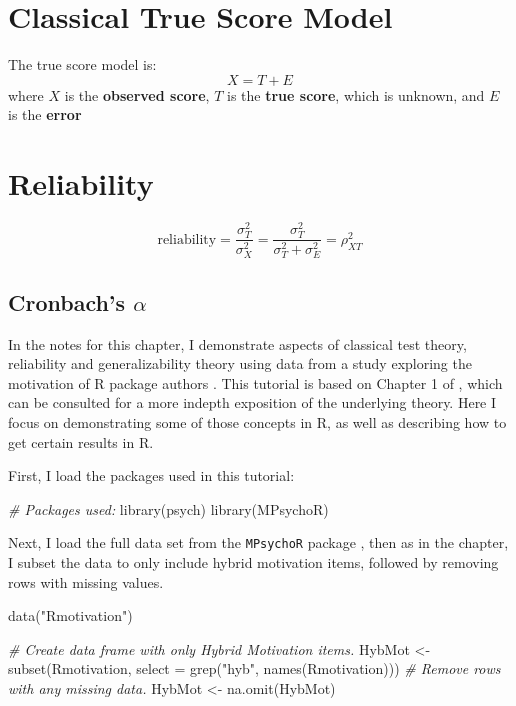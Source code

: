 \documentclass[
]{book}
\newenvironment{Shaded}{\begin{snugshade}}{\end{snugshade}}
\newcommand{\AttributeTok}[1]{\textcolor[rgb]{0.77,0.63,0.00}{#1}}
\newcommand{\CommentTok}[1]{\textcolor[rgb]{0.56,0.35,0.01}{\textit{#1}}}
\newcommand{\FunctionTok}[1]{\textcolor[rgb]{0.00,0.00,0.00}{#1}}
\newcommand{\NormalTok}[1]{#1}
\newcommand{\OtherTok}[1]{\textcolor[rgb]{0.56,0.35,0.01}{#1}}
\newcommand{\StringTok}[1]{\textcolor[rgb]{0.31,0.60,0.02}{#1}}
\begin{document}
\hypertarget{classical-true-score-model}{%
\section{Classical True Score Model}\label{classical-true-score-model}}

The true score model is:
\[
X = T + E
\]
where \(X\) is the \textbf{observed score}, \(T\) is the \textbf{true score}, which is unknown, and \(E\) is the \textbf{error}

\hypertarget{reliability}{%
\section{Reliability}\label{reliability}}

\[
\text{reliability} = \frac{\sigma^2_T}{\sigma^2_X} = \frac{\sigma^2_T}{\sigma^2_T + \sigma^2_E} = \rho^2_{XT}
\]

\hypertarget{cronbachs-alpha}{%
\subsection{\texorpdfstring{Cronbach's \(\alpha\)}{Cronbach's \textbackslash alpha}}\label{cronbachs-alpha}}

In the notes for this chapter, I demonstrate aspects of classical test theory, reliability and generalizability theory using data from a study exploring the motivation of R package authors \citep{mair2015motivation}.
This tutorial is based on Chapter 1 of \citet{mair2018modern}, which can be consulted for a more indepth exposition of the underlying theory.
Here I focus on demonstrating some of those concepts in R, as well as describing how to get certain results in R.

First, I load the packages used in this tutorial:

\begin{Shaded}
\begin{Highlighting}[]
\CommentTok{\# Packages used:}
\FunctionTok{library}\NormalTok{(psych)}
\FunctionTok{library}\NormalTok{(MPsychoR)}
\end{Highlighting}
\end{Shaded}

Next, I load the full data set from the \texttt{MPsychoR} package \citep{Mair2020mpsychor}, then as in the chapter, I subset the data to only include hybrid motivation items, followed by removing rows with missing values.

\begin{Shaded}
\begin{Highlighting}[]
\FunctionTok{data}\NormalTok{(}\StringTok{"Rmotivation"}\NormalTok{)}

\CommentTok{\# Create data frame with only Hybrid Motivation items.}
\NormalTok{HybMot }\OtherTok{\textless{}{-}} \FunctionTok{subset}\NormalTok{(Rmotivation, }
                        \AttributeTok{select =} \FunctionTok{grep}\NormalTok{(}\StringTok{"hyb"}\NormalTok{, }\FunctionTok{names}\NormalTok{(Rmotivation)))}
\CommentTok{\# Remove rows  with any missing data.}
\NormalTok{HybMot }\OtherTok{\textless{}{-}} \FunctionTok{na.omit}\NormalTok{(HybMot)}
\end{Highlighting}
\end{Shaded}
\end{document}
